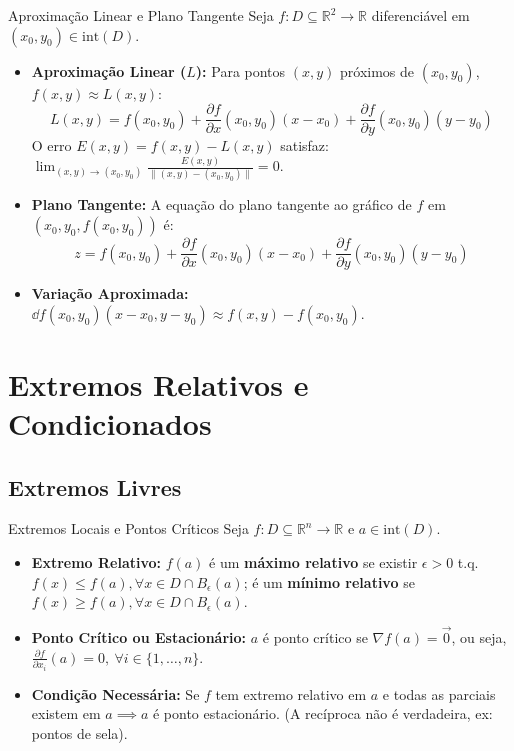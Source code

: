 \documentclass[11pt,a4paper]{article}
\newcommand{\R}{\mathbb{R}}
\begin{document}
\noindent\begin{formulabox}{Aproximação Linear e Plano Tangente}
  Seja $f : D \subseteq \R^2 \to \R$ diferenciável em $(x_0, y_0) \in \text{int}(D)$.
  \begin{itemize}
    \item \textbf{Aproximação Linear ($L$):} Para pontos $(x,y)$ próximos de $(x_0, y_0)$, $f(x, y) \approx L(x, y)$:
      \[ L(x, y) = f(x_0, y_0) + \frac{\partial f}{\partial x}(x_0, y_0)(x - x_0) + \frac{\partial f}{\partial y}(x_0, y_0)(y - y_0) \]
      O erro $E(x,y) = f(x,y) - L(x,y)$ satisfaz: $\lim_{(x,y)\to(x_0,y_0)} \frac{E(x,y)}{\|(x,y) - (x_0,y_0)\|} = 0$.
    \item \textbf{Plano Tangente:} A equação do plano tangente ao gráfico de $f$ em $(x_0, y_0, f(x_0,y_0))$ é:
      \[ z = f(x_0, y_0) + \frac{\partial f}{\partial x}(x_0, y_0)(x - x_0) + \frac{\partial f}{\partial y}(x_0, y_0)(y - y_0) \]
    \item \textbf{Variação Aproximada:} $\dd f(x_0, y_0)(x - x_0, y - y_0) \approx f(x, y) - f(x_0, y_0)$.
  \end{itemize}
\end{formulabox}

\newpage

\section{Extremos Relativos e Condicionados}
\label{chap:extremos}

\subsection{Extremos Livres}

\noindent\begin{definitionbox}{Extremos Locais e Pontos Críticos}
  Seja $f : D \subseteq \R^n \to \R$ e $a \in \text{int}(D)$.
  \begin{itemize}
    \item \textbf{Extremo Relativo:} $f(a)$ é um \textbf{máximo relativo} se existir $\epsilon>0$ t.q. $f(x) \leq f(a), \forall x \in D \cap B_\epsilon(a)$; é um \textbf{mínimo relativo} se $f(x) \geq f(a), \forall x \in D \cap B_\epsilon(a)$.
    \item \textbf{Ponto Crítico ou Estacionário:} $a$ é ponto crítico se $\nabla f(a) = \vec{0}$, ou seja, $\frac{\partial f}{\partial x_i}(a) = 0, \ \forall i \in \{1,\dots,n\}$.
    \item \textbf{Condição Necessária:} Se $f$ tem extremo relativo em $a$ e todas as parciais existem em $a \implies a$ é ponto estacionário. (A recíproca não é verdadeira, ex: pontos de sela).
  \end{itemize}
\end{definitionbox}
\end{document}
